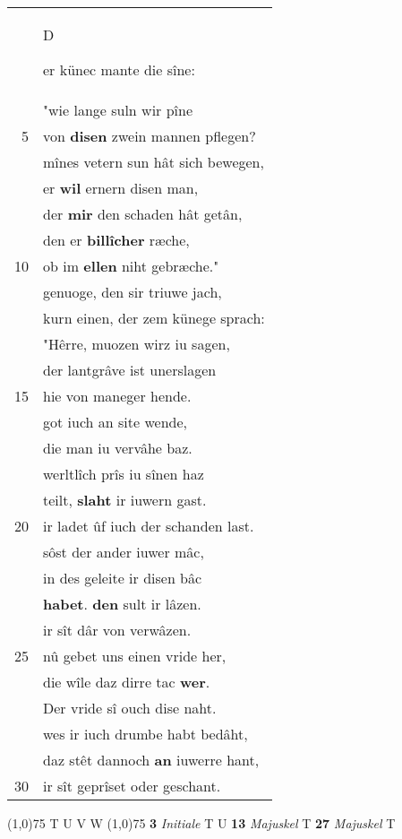 \documentclass[8pt,a4paper,notitlepage]{article}
\begin{document}
\begin{table}[ht]
\begin{minipage}[t]{0.5\linewidth}
\begin{tabular}{rl}
 & \begin{large}D\end{large}er künec mante die sîne:\\ 
 & "wie lange suln wir pîne\\ 
5 & von \textbf{disen} zwein mannen pflegen?\\ 
 & mînes vetern sun hât sich bewegen,\\ 
 & er \textbf{wil} ernern disen man,\\ 
 & der \textbf{mir} den schaden hât getân,\\ 
 & den er \textbf{billîcher} ræche,\\ 
10 & ob im \textbf{ellen} niht gebræche."\\ 
 & genuoge, den sir triuwe jach,\\ 
 & kurn einen, der zem künege sprach:\\ 
 & "Hêrre, muozen wirz iu sagen,\\ 
 & der lantgrâve ist unerslagen\\ 
15 & hie von maneger hende.\\ 
 & got iuch an site wende,\\ 
 & die man iu vervâhe baz.\\ 
 & werltlîch prîs iu sînen haz\\ 
 & teilt, \textbf{slaht} ir iuwern gast.\\ 
20 & ir ladet ûf iuch der schanden last.\\ 
 & sôst der ander iuwer mâc,\\ 
 & in des geleite ir disen bâc\\ 
 & \textbf{habet}. \textbf{den} sult ir lâzen.\\ 
 & ir sît dâr von verwâzen.\\ 
25 & nû gebet uns einen vride her,\\ 
 & die wîle daz dirre tac \textbf{wer}.\\ 
 & Der vride sî ouch dise naht.\\ 
 & wes ir iuch drumbe habt bedâht,\\ 
 & daz stêt dannoch \textbf{an} iuwerre hant,\\ 
30 & ir sît geprîset oder geschant.\\ 
\end{tabular}
\scriptsize
\line(1,0){75} \newline
T U V W \newline
\line(1,0){75} \newline
\textbf{3} \textit{Initiale} T U  \textbf{13} \textit{Majuskel} T  \textbf{27} \textit{Majuskel} T  \newline

\end{minipage}
\end{table}
\end{document}

